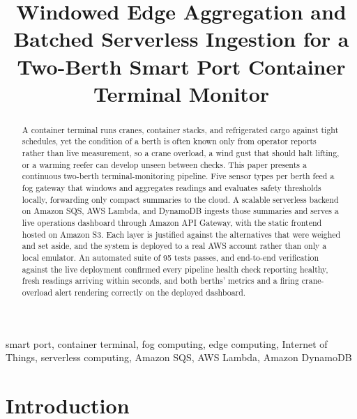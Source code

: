 \documentclass[conference]{IEEEtran}
\begin{document}
\title{Windowed Edge Aggregation and Batched Serverless Ingestion for a Two-Berth Smart Port Container Terminal Monitor}

\author{
}

\maketitle

\begin{abstract}
A container terminal runs cranes, container stacks, and refrigerated cargo against tight schedules, yet the condition of a berth is often known only from operator reports rather than live measurement, so a crane overload, a wind gust that should halt lifting, or a warming reefer can develop unseen between checks. This paper presents a continuous two-berth terminal-monitoring pipeline. Five sensor types per berth feed a fog gateway that windows and aggregates readings and evaluates safety thresholds locally, forwarding only compact summaries to the cloud. A scalable serverless backend on Amazon SQS, AWS Lambda, and DynamoDB ingests those summaries and serves a live operations dashboard through Amazon API Gateway, with the static frontend hosted on Amazon S3. Each layer is justified against the alternatives that were weighed and set aside, and the system is deployed to a real AWS account rather than only a local emulator. An automated suite of 95 tests passes, and end-to-end verification against the live deployment confirmed every pipeline health check reporting healthy, fresh readings arriving within seconds, and both berths' metrics and a firing crane-overload alert rendering correctly on the deployed dashboard.
\end{abstract}

\begin{IEEEkeywords}
smart port, container terminal, fog computing, edge computing, Internet of Things, serverless computing, Amazon SQS, AWS Lambda, Amazon DynamoDB
\end{IEEEkeywords}

\section{Introduction}
\end{document}
